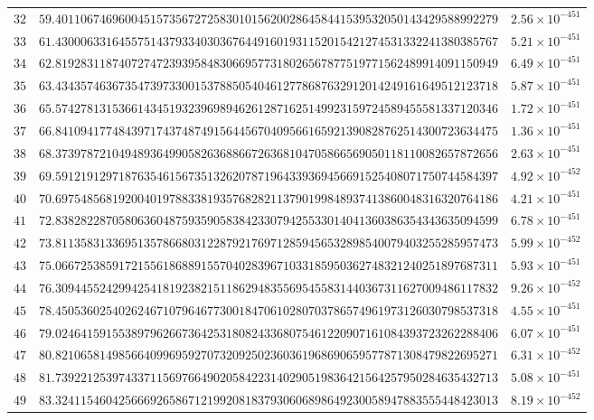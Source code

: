 \documentclass[12pt,reqno]{amsart}
\theoremstyle{remark}
\begin{document}
\begin{longtable}{clc}
$32$ & $59.4011067469600451573567272583010156200286458441539532050143429588992279$ & $2.56\times 10^{-451}$ \\
$33$ & $61.4300063316455751437933403036764491601931152015421274531332241380385767$ & $5.21\times 10^{-451}$ \\
$34$ & $62.8192831187407274723939584830669577318026567877519771562489914091150949$ & $6.49\times 10^{-451}$ \\
$35$ & $63.4343574636735473973300153788505404612778687632912014249161649512123718$ & $5.87\times 10^{-451}$ \\
$36$ & $65.5742781315366143451932396989462612871625149923159724589455581337120346$ & $1.72\times 10^{-451}$ \\
$37$ & $66.8410941774843971743748749156445670409566165921390828762514300723634475$ & $1.36\times 10^{-451}$ \\
$38$ & $68.3739787210494893649905826368866726368104705866569050118110082657872656$ & $2.63\times 10^{-451}$ \\
$39$ & $69.5912191297187635461567351326207871964339369456691525408071750744584397$ & $4.92\times 10^{-452}$ \\
$40$ & $70.6975485681920040197883381935768282113790199848937413860048316320764186$ & $4.21\times 10^{-451}$ \\
$41$ & $72.8382822870580636048759359058384233079425533014041360386354343635094599$ & $6.78\times 10^{-451}$ \\
$42$ & $73.8113583133695135786680312287921769712859456532898540079403255285957473$ & $5.99\times 10^{-452}$ \\
$43$ & $75.0667253859172155618688915570402839671033185950362748321240251897687311$ & $5.93\times 10^{-451}$ \\
$44$ & $76.3094455242994254181923821511862948355695455831440367311627009486117832$ & $9.26\times 10^{-452}$ \\
$45$ & $78.4505360254026246710796467730018470610280703786574961973126030798537318$ & $4.55\times 10^{-451}$ \\
$46$ & $79.0246415915538979626673642531808243368075461220907161084393723262288406$ & $6.07\times 10^{-451}$ \\
$47$ & $80.8210658149856640996959270732092502360361968690659577871308479822695271$ & $6.31\times 10^{-452}$ \\
$48$ & $81.7392212539743371156976649020584223140290519836421564257950284635432713$ & $5.08\times 10^{-451}$ \\
$49$ & $83.3241154604256669265867121992081837930606898649230058947883555448423013$ & $8.19\times 10^{-452}$ \\

\end{longtable}
\end{document}
